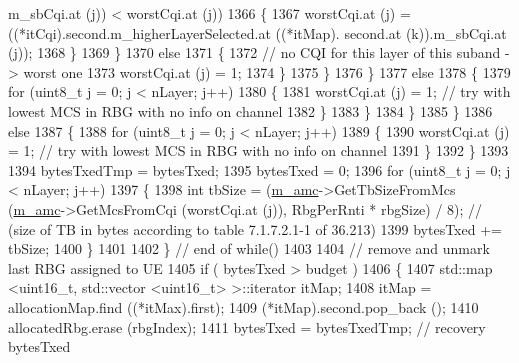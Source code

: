 \begin{DoxyCode}
      m\_sbCqi.at (j)) < worstCqi.at (j))
1366                                 \{
1367                                   worstCqi.at (j) = ((*itCqi).second.m\_higherLayerSelected.at ((*itMap).
      second.at (k)).m\_sbCqi.at (j));
1368                                 \}
1369                             \}
1370                           \textcolor{keywordflow}{else}
1371                             \{
1372                               \textcolor{comment}{// no CQI for this layer of this suband -> worst one}
1373                               worstCqi.at (j) = 1;
1374                             \}
1375                         \}
1376                     \}
1377                   \textcolor{keywordflow}{else}
1378                     \{
1379                       \textcolor{keywordflow}{for} (uint8\_t j = 0; j < nLayer; j++)
1380                         \{
1381                           worstCqi.at (j) = 1; \textcolor{comment}{// try with lowest MCS in RBG with no info on channel}
1382                         \}
1383                     \}
1384                 \}
1385             \}
1386           \textcolor{keywordflow}{else}
1387             \{
1388               \textcolor{keywordflow}{for} (uint8\_t j = 0; j < nLayer; j++)
1389                 \{
1390                   worstCqi.at (j) = 1; \textcolor{comment}{// try with lowest MCS in RBG with no info on channel}
1391                 \}
1392             \}
1393  
1394           bytesTxedTmp = bytesTxed;
1395           bytesTxed = 0;
1396           \textcolor{keywordflow}{for} (uint8\_t j = 0; j < nLayer; j++)
1397             \{
1398               \textcolor{keywordtype}{int} tbSize = (\hyperlink{classns3_1_1FdTbfqFfMacScheduler_a53e0bcb714cd32ee639f7b4e7265087c}{m\_amc}->GetTbSizeFromMcs (\hyperlink{classns3_1_1FdTbfqFfMacScheduler_a53e0bcb714cd32ee639f7b4e7265087c}{m\_amc}->GetMcsFromCqi (worstCqi.at (j)), 
      RbgPerRnti * rbgSize) / 8); \textcolor{comment}{// (size of TB in bytes according to table 7.1.7.2.1-1 of 36.213) }
1399               bytesTxed += tbSize;
1400             \}
1401 
1402         \} \textcolor{comment}{// end of while()}
1403 
1404         \textcolor{comment}{// remove and unmark last RBG assigned to UE}
1405       \textcolor{keywordflow}{if} ( bytesTxed > budget )
1406         \{
1407           std::map <uint16\_t, std::vector <uint16\_t> >::iterator itMap;
1408           itMap = allocationMap.find ((*itMax).first);
1409           (*itMap).second.pop\_back ();
1410           allocatedRbg.erase (rbgIndex);
1411           bytesTxed = bytesTxedTmp;  \textcolor{comment}{// recovery bytesTxed}

\end{DoxyCode}
